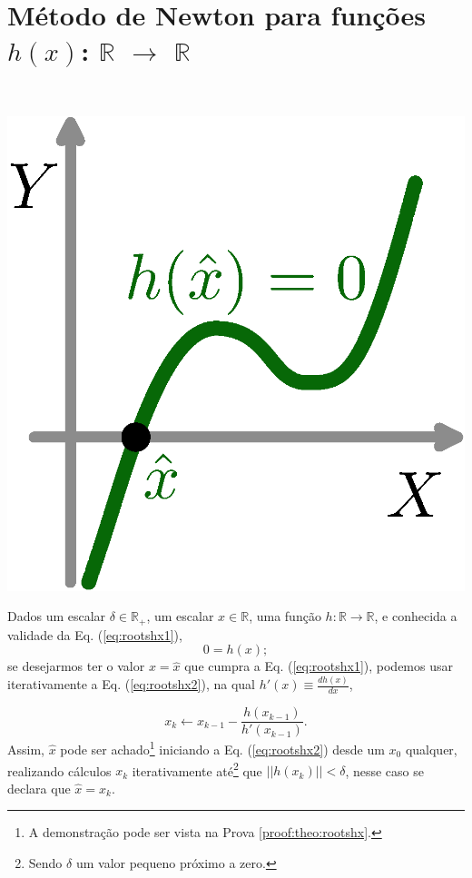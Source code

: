 
\section{ Método de Newton para funções $h(x)$: $\mathbb{R}$ $\rightarrow$ $\mathbb{R}$ }

\begin{theorem}\label{theo:rootshx}
~\\
\begin{minipage}{0.20\textwidth}
\centering
\includegraphics[width=0.9\linewidth]{chapters/roots/roots1.eps} 
\end{minipage}
\begin{minipage}{0.8\textwidth}
Dados
um escalar $\delta \in \mathbb{R}_+$, 
um escalar $x \in \mathbb{R}$, 
uma função $h:\mathbb{R} \rightarrow \mathbb{R}$, e 
conhecida a validade da Eq. (\ref{eq:rootshx1}),
\begin{equation}\label{eq:rootshx1}
0=h(x);
\end{equation}
se desejarmos ter o valor $x=\hat{x}$ que cumpra a Eq. (\ref{eq:rootshx1}),
podemos usar iterativamente a Eq. (\ref{eq:rootshx2}),
na qual $h'(x)\equiv \frac{d h(x)}{d x}$,
\end{minipage}

\begin{equation}\label{eq:rootshx2}
x_{k} \leftarrow x_{k-1}-\frac{ h(x_{k-1})}{h'(x_{k-1})}.
\end{equation}
Assim, $\hat{x}$ pode ser achado\footnote{A 
demonstração pode ser vista na Prova \ref{proof:theo:rootshx}.} 
iniciando a Eq. (\ref{eq:rootshx2}) desde um 
$x_{0}$ qualquer, realizando cálculos $x_{k}$ iterativamente  
até\footnote{Sendo $\delta$ um valor pequeno próximo a zero.} que $||h(x_k)||<\delta$,
nesse caso se declara que $\hat{x}=x_k$.


\end{theorem}
